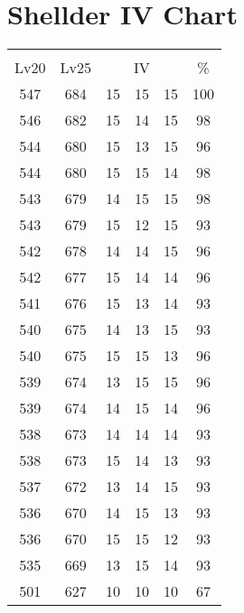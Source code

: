 \documentclass{article}%
\begin{document}
%
\normalsize%
\section{Shellder IV Chart}%
\label{sec:Shellder IV Chart}%
\renewcommand{\arraystretch}{1.5}%
\begin{tabular}{|c|c|c|c|c|c|}%
\hline%
\multicolumn{6}{|c|}{\textcolor{white}{ 
\linebreak{Shellder}
}%
\cellcolor{black}}\\%
\multicolumn{1}{|c}{Lv20}&\multicolumn{1}{c|}{Lv25}&\multicolumn{3}{c|}{IV}&\multicolumn{1}{|c|}{\%}\\%
\hline%
\rowcolor{color100}%
547&684&15&15&15&100\\%
\hline%
\rowcolor{color98}%
546&682&15&14&15&98\\%
\hline%
\rowcolor{color96}%
544&680&15&13&15&96\\%
\hline%
\rowcolor{color98}%
544&680&15&15&14&98\\%
\hline%
\rowcolor{color98}%
543&679&14&15&15&98\\%
\hline%
\rowcolor{color93}%
543&679&15&12&15&93\\%
\hline%
\rowcolor{color96}%
542&678&14&14&15&96\\%
\hline%
\rowcolor{color96}%
542&677&15&14&14&96\\%
\hline%
\rowcolor{color93}%
541&676&15&13&14&93\\%
\hline%
\rowcolor{color93}%
540&675&14&13&15&93\\%
\hline%
\rowcolor{color96}%
540&675&15&15&13&96\\%
\hline%
\rowcolor{color96}%
539&674&13&15&15&96\\%
\hline%
\rowcolor{color96}%
539&674&14&15&14&96\\%
\hline%
\rowcolor{color93}%
538&673&14&14&14&93\\%
\hline%
\rowcolor{color93}%
538&673&15&14&13&93\\%
\hline%
\rowcolor{color93}%
537&672&13&14&15&93\\%
\hline%
\rowcolor{color93}%
536&670&14&15&13&93\\%
\hline%
\rowcolor{color93}%
536&670&15&15&12&93\\%
\hline%
\rowcolor{color93}%
535&669&13&15&14&93\\%
\hline%
\rowcolor{color91}%
501&627&10&10&10&67\\%
\end{tabular}

%
\end{document}
